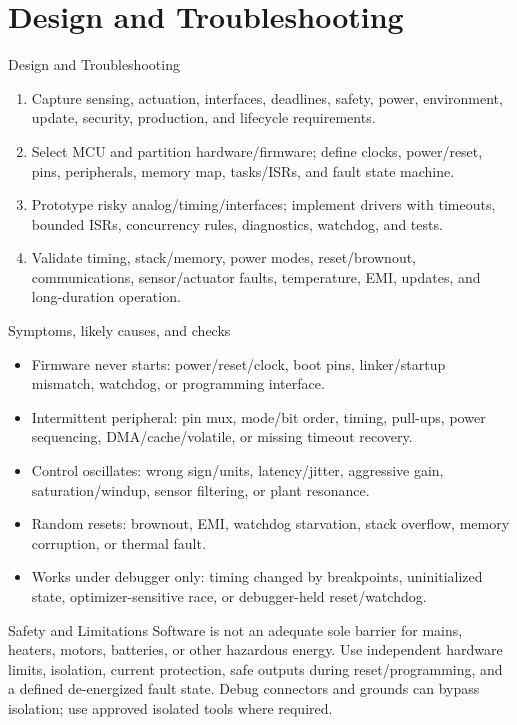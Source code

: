 \documentclass[10pt,letterpaper]{article}
\begin{document}
\section{Design and Troubleshooting}
\begin{CornellExamBox}{Design and Troubleshooting}
\begin{enumerate}
  \item Capture sensing, actuation, interfaces, deadlines, safety, power, environment, update, security, production, and lifecycle requirements.
  \item Select MCU and partition hardware/firmware; define clocks, power/reset, pins, peripherals, memory map, tasks/ISRs, and fault state machine.
  \item Prototype risky analog/timing/interfaces; implement drivers with timeouts, bounded ISRs, concurrency rules, diagnostics, watchdog, and tests.
  \item Validate timing, stack/memory, power modes, reset/brownout, communications, sensor/actuator faults, temperature, EMI, updates, and long-duration operation.
\end{enumerate}\end{CornellExamBox}
\begin{CornellExamBox}{Symptoms, likely causes, and checks}
\begin{itemize}
  \item Firmware never starts: power/reset/clock, boot pins, linker/startup mismatch, watchdog, or programming interface.
  \item Intermittent peripheral: pin mux, mode/bit order, timing, pull-ups, power sequencing, DMA/cache/volatile, or missing timeout recovery.
  \item Control oscillates: wrong sign/units, latency/jitter, aggressive gain, saturation/windup, sensor filtering, or plant resonance.
  \item Random resets: brownout, EMI, watchdog starvation, stack overflow, memory corruption, or thermal fault.
  \item Works under debugger only: timing changed by breakpoints, uninitialized state, optimizer-sensitive race, or debugger-held reset/watchdog.
\end{itemize}\end{CornellExamBox}
\begin{CornellWarningBox}{Safety and Limitations}
Software is not an adequate sole barrier for mains, heaters, motors, batteries, or other hazardous energy. Use independent hardware limits, isolation, current protection, safe outputs during reset/programming, and a defined de-energized fault state. Debug connectors and grounds can bypass isolation; use approved isolated tools where required.
\end{CornellWarningBox}
\end{document}
